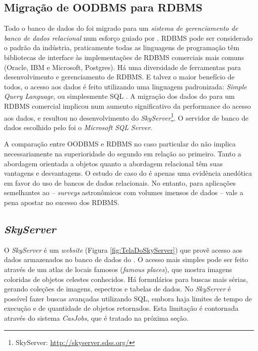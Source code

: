 \subsection{Migração de OODBMS para RDBMS}
\label{sec:CrossMatch:SDSS:MigracaoRDBMS}

Todo o banco de dados do \SDSS foi migrado para um {\em sistema de gerenciamento
de banco de dados relacional} \citep[Relational Database Management System,
RDBMS;][]{Codd1970} num esforço guiado por \citeauthor{Thakar2004}. RDBMS pode
ser considerado o padrão da indústria, praticamente todas as linguagens de
programação têm bibliotecas de interface às implementações de RDBMS comerciais
mais comuns (Oracle, IBM e Microsoft, Postgres). Há uma diversidade de
ferramentas para desenvolvimento e gerenciamento de RDBMS. E talvez o maior
benefício de todos, o acesso aos dados é feito utilizando uma linguagem
padronizada: {\em Simple Query Language}, ou simplesmente SQL
\citep{Chamberlin1974}. A migração dos dados do \SDSS para um RDBMS comercial
implicou num aumento significativo da performance do acesso aos dados, e
resultou no desenvolvimento do {\em SkyServer}\footnote{\SDSS SkyServer:
\url{http://skyserver.sdss.org/}}. O servidor de banco de dados escolhido pelo
\SDSS foi o {\em Microsoft SQL Server}.

A comparação entre OODBMS e RDBMS no caso particular do \SDSS não implica
necessariamente na superioridade do segundo em relação ao primeiro. Tanto a
abordagem orientada a objetos quanto a abordagem relacional têm suas vantagens e
desvantagens. O estudo de caso do \SDSS é apenas uma evidência anedótica em
favor do uso de bancos de dados relacionais. No entanto, para aplicações
semelhantes ao \SDSS -- {\em surveys} astronômicos com volumes imensos de dados
-- vale a pena apostar no sucesso dos RDBMS.

\subsection{{\em SkyServer}}
\label{sec:CrossMatch:SDSS:SkyServer}

O {\em SkyServer} é um {\em website} (Figura \ref{fig:TelaDoSkyServer}) que
provê acesso aos dados armazenados no banco de dados do \SDSS
\citep{Szalay2002}. O acesso mais simples pode ser feito através de um atlas de
locais famosos ({\em famous places}), que mostra imagens coloridas de objetos
celestes conhecidos. Há formulários para buscas mais sérias, gerando coleções de
imagens, espectros e tabelas de dados. No {\em SkyServer} é possível fazer
buscas avançadas utilizando SQL, embora haja limites de tempo de execução e de
quantidade de objetos retornados. Esta limitação é contornada através do sistema
{\em CasJobs}, que é tratado na próxima seção.

